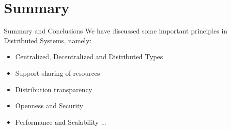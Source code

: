 \section{Summary}

\begin{slide}{Summary and Conclusions}
We have discussed some important principles
in Distributed Systems, namely:
\begin{itemize}
  \item Centralized, Decentralized and Distributed Types
  \item Support sharing of resources
  \item Distribution transparency
  \item Openness and Security
  \item Performance and Scalability ...
\end{itemize}  
\end{slide}
